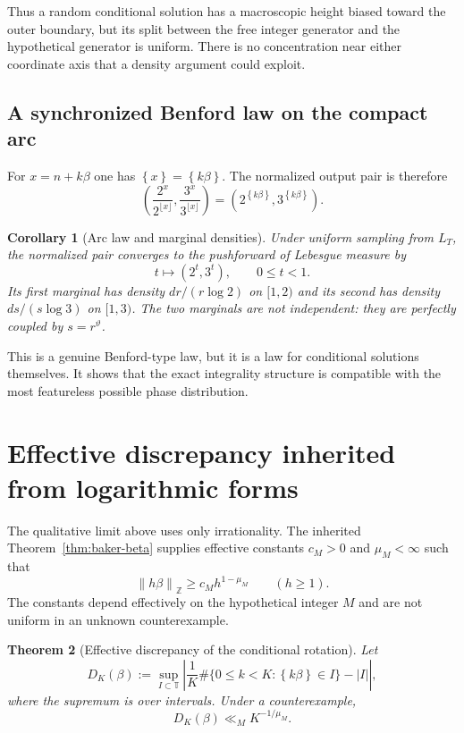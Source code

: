 \documentclass[11pt,oneside]{article}
\newtheorem{theorem}{Theorem}[section]
\newtheorem{corollary}[theorem]{Corollary}
\theoremstyle{definition}
\theoremstyle{remark}
\newcommand{\Z}{\mathbb Z}
\newcommand{\Torus}{\mathbb T}
\newcommand{\thetaq}{\vartheta}
\newcommand{\fract}[1]{\left\{#1\right\}}
\newcommand{\distZ}[1]{\left\lVert #1\right\rVert_{\Z}}
\begin{document}
Thus a random conditional solution has a macroscopic height biased toward the outer boundary,
but its split between the free integer generator and the hypothetical generator is uniform.
There is no concentration near either coordinate axis that a density argument could exploit.

\subsection{A synchronized Benford law on the compact arc}

For $x=n+k\beta$ one has $\fract x=\fract{k\beta}$.  The normalized output pair is therefore
\[
 \left(\frac{2^x}{2^{\lfloor x\rfloor}},
       \frac{3^x}{3^{\lfloor x\rfloor}}\right)
 =\left(2^{\fract{k\beta}},3^{\fract{k\beta}}\right).
\]

\begin{corollary}[Arc law and marginal densities]
\label{mt:cor-arc-law}
Under uniform sampling from $L_T$, the normalized pair converges to the pushforward of Lebesgue
measure by
\[
  t\longmapsto(2^t,3^t),\qquad 0\le t<1.
\]
Its first marginal has density $dr/(r\log2)$ on $[1,2)$ and its second has density
$ds/(s\log3)$ on $[1,3)$.  The two marginals are not independent: they are perfectly coupled
by $s=r^{\thetaq}$.
\end{corollary}

This is a genuine Benford-type law, but it is a law for conditional solutions themselves.  It
shows that the exact integrality structure is compatible with the most featureless possible
phase distribution.

\section{Effective discrepancy inherited from logarithmic forms}
\label{mt:sec-effective}

The qualitative limit above uses only irrationality.  The inherited
Theorem~\ref{thm:baker-beta} supplies effective constants $c_M>0$ and $\mu_M<\infty$ such that
\begin{equation}
  \distZ{h\beta}\ge c_M h^{1-\mu_M}
  \qquad(h\ge1).
  \label{mt:eq-finite-mu}
\end{equation}
The constants depend effectively on the hypothetical integer $M$ and are not uniform in an
unknown counterexample.

\begin{theorem}[Effective discrepancy of the conditional rotation]
\label{mt:thm-discrepancy}
Let
\[
 D_K(\beta):=\sup_{I\subset\Torus}
 \left|\frac1K\#\{0\le k<K:\fract{k\beta}\in I\}-|I|\right|,
\]
where the supremum is over intervals.  Under a counterexample,
\begin{equation}
  D_K(\beta)\ll_M K^{-1/\mu_M}.
  \label{mt:eq-discrepancy}
\end{equation}
\end{theorem}
\end{document}
